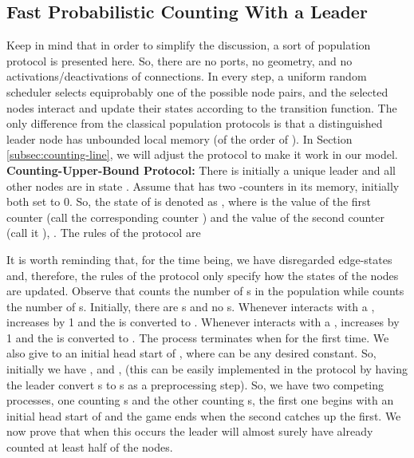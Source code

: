 \documentclass[oribibl, 11pt]{llncs}
\begin{document}
\subsection{Fast Probabilistic Counting With a Leader}
\label{subsec:leader-counting}

Keep in mind that in order to simplify the discussion, a sort of population protocol is presented here. So, there are no ports, no geometry, and no activations/deactivations of connections. In every step, a uniform random scheduler selects equiprobably one of the  possible node pairs, and the selected nodes interact and update their states according to the transition function. The only difference from the classical population protocols is that a distinguished leader node has unbounded local memory (of the order of ). In Section \ref{subsec:counting-line}, we will adjust the protocol to make it work in our model.\\

\noindent\textbf{Counting-Upper-Bound Protocol:} There is initially a unique leader  and all other nodes are in state . Assume that  has two -counters in its memory, initially both set to 0. So, the state of  is denoted as , where  is the value of the first counter (call the corresponding counter ) and  the value of the second counter (call it ), . The rules of the protocol are 

It is worth reminding that, for the time being, we have disregarded edge-states and, therefore, the rules of the protocol only specify how the states of the nodes are updated. Observe that  counts the number of s in the population while  counts the number of s. Initially, there are  s and no s. Whenever  interacts with a ,  increases by 1 and the  is converted to . Whenever  interacts with a ,  increases by 1 and the  is converted to . The process terminates when  for the first time. We also give to  an initial head start of , where  can be any desired constant. So, initially we have ,  and ,  (this can be easily implemented in the protocol by having the leader convert  s to s as a preprocessing step). So, we have two competing processes, one counting s and the other counting s, the first one begins with an initial head start of  and the game ends when the second catches up the first. We now prove that when this occurs the leader will almost surely have already counted at least half of the nodes.
\end{document}

